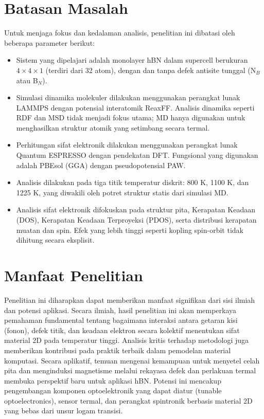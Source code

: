 \section{Batasan Masalah}
Untuk menjaga fokus dan kedalaman analisis, penelitian ini dibatasi oleh beberapa parameter berikut:
\begin{itemize}
    \item Sistem yang dipelajari adalah monolayer hBN dalam supercell berukuran $4 \times 4 \times 1$ (terdiri dari 32 atom), dengan dan tanpa defek antisite tunggal (N$_B$ atau B$_N$).
    \item Simulasi dinamika molekuler dilakukan menggunakan perangkat lunak LAMMPS dengan potensial interatomik ReaxFF. Analisis dinamika seperti RDF dan MSD tidak menjadi fokus utama; MD hanya digunakan untuk menghasilkan struktur atomik yang setimbang secara termal.
    \item Perhitungan sifat elektronik dilakukan menggunakan perangkat lunak Quantum ESPRESSO dengan pendekatan DFT. Fungsional yang digunakan adalah PBEsol (GGA) dengan pseudopotensial PAW.
    \item Analisis dilakukan pada tiga titik temperatur diskrit: 800 K, 1100 K, dan 1225 K, yang diwakili oleh potret struktur statis dari simulasi MD.
    \item Analisis sifat elektronik difokuskan pada struktur pita, Kerapatan Keadaan (DOS), Kerapatan Keadaan Terproyeksi (PDOS), serta distribusi kerapatan muatan dan spin. Efek yang lebih tinggi seperti kopling spin-orbit tidak dihitung secara eksplisit.
\end{itemize}

\section{Manfaat Penelitian}
Penelitian ini diharapkan dapat memberikan manfaat signifikan dari sisi ilmiah dan potensi aplikasi.
Secara ilmiah, hasil penelitian ini akan memperkaya pemahaman fundamental tentang bagaimana interaksi antara getaran kisi (fonon), defek titik, dan keadaan elektron secara kolektif menentukan sifat material 2D pada temperatur tinggi. Analisis kritis terhadap metodologi juga memberikan kontribusi pada praktik terbaik dalam pemodelan material komputasi.
Secara aplikatif, temuan mengenai kemampuan untuk menyetel celah pita dan menginduksi magnetisme melalui rekayasa defek dan perlakuan termal membuka perspektif baru untuk aplikasi hBN. Potensi ini mencakup pengembangan komponen optoelektronik yang dapat diatur (tunable optoelectronics), sensor termal, dan perangkat spintronik berbasis material 2D yang bebas dari unsur logam transisi.